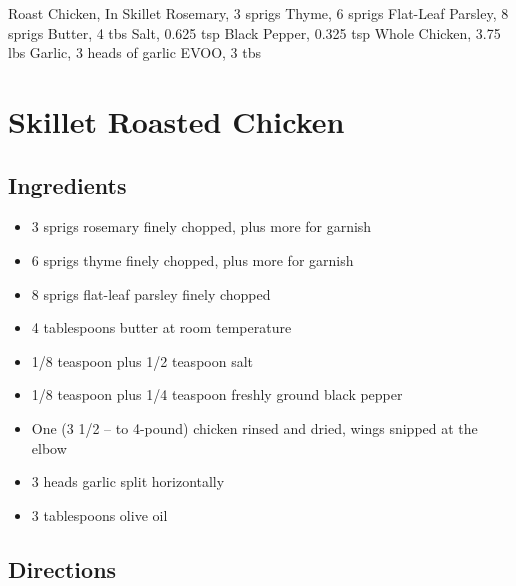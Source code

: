 Roast Chicken, In Skillet
  Rosemary, 3 sprigs
  Thyme, 6 sprigs
  Flat-Leaf Parsley, 8 sprigs
  Butter, 4 tbs
  Salt, 0.625 tsp
  Black Pepper, 0.325 tsp
  Whole Chicken, 3.75 lbs
  Garlic, 3 heads of garlic
  EVOO, 3 tbs

\section{ Skillet Roasted Chicken }

\subsection{ Ingredients }

\begin{itemize}
  \item 3 sprigs rosemary finely chopped, plus more for garnish
  \item 6 sprigs thyme finely chopped, plus more for garnish
  \item 8 sprigs flat-leaf parsley finely chopped
  \item 4 tablespoons butter at room temperature
  \item 1/8 teaspoon plus 1/2 teaspoon salt
  \item 1/8 teaspoon plus 1/4 teaspoon freshly ground black pepper
  \item One (3 1/2 – to 4-pound) chicken rinsed and dried, wings snipped at the elbow
  \item 3 heads garlic split horizontally
  \item 3 tablespoons olive oil
\end{itemize}

\subsection{ Directions }

